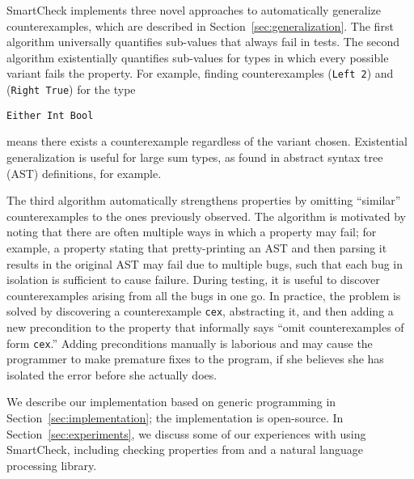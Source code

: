 \documentclass{sigplanconf}
\newenvironment{code}{\begin{alltt}\footnotesize}{\end{alltt}}
\newcommand{\ttp}[1]{\texttt{#1}}
\begin{document}

SmartCheck implements three novel approaches to automatically generalize
counterexamples, which are described in Section~\ref{sec:generalization}.  The
first algorithm universally quantifies sub-values that always fail in tests.
The second algorithm existentially quantifies sub-values for types in which
every possible variant fails the property.  For example, finding counterexamples
(\ttp{Left 2}) and (\ttp{Right True}) for the type
%
\begin{code}
\ttp{Either Int Bool}
\end{code}
%
\noindent
means there exists a counterexample regardless of the variant chosen.
Existential generalization is useful for large sum types, as found in
abstract syntax tree (AST) definitions, for example.

The third algorithm automatically strengthens properties by omitting ``similar''
counterexamples to the ones previously observed.  The algorithm is motivated by
noting that there are often multiple ways in which a property may fail; for
example, a property stating that pretty-printing an AST and then parsing it
results in the original AST may fail due to multiple bugs, such that each bug in
isolation is sufficient to cause failure.  During testing, it is useful to
discover counterexamples arising from all the bugs in one go.  In practice, the
problem is solved by discovering a counterexample \ttp{cex}, abstracting it, and
then adding a new precondition to the property that informally says ``omit
counterexamples of form \ttp{cex}.''  Adding preconditions manually is laborious
and may cause the programmer to make premature fixes to the program, if she
believes she has isolated the error before she actually does.

We describe our implementation based on generic programming in
Section~\ref{sec:implementation}; the implementation is open-source.  In
Section~\ref{sec:experiments}, we discuss some of our experiences with using
SmartCheck, including checking properties from \xmonad and a natural language
processing library.
\end{document}
